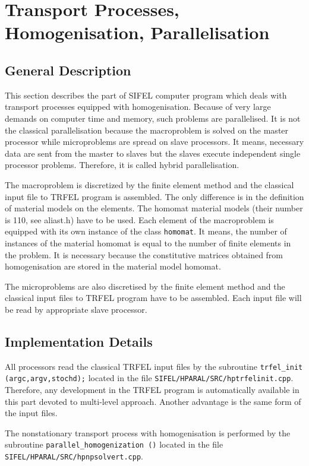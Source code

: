 \section{Transport Processes, Homogenisation, Parallelisation}

\subsection{General Description}

This section describes the part of SIFEL computer program
which deals with transport processes equipped with homogenisation.
Because of very large demands on computer time and memory,
such problems are parallelised. It is not the classical
parallelisation because the macroproblem is solved on the
master processor while microproblems are spread on slave processors.
It means, necessary data are sent from the master to slaves
but the slaves execute independent single processor problems.
Therefore, it is called hybrid parallelisation.

The macroproblem is discretized by the finite element method
and the classical input file to TRFEL program is assembled.
The only difference is in the definition of material models
on the elements. The homomat material models (their number is
110, see aliast.h) have to be used. Each element of the
macroproblem is equipped with its own instance of the class
{\tt homomat}. It means, the number of instances of the
material homomat is equal to the number of finite elements
in the problem. It is necessary because the constitutive matrices
obtained from homogenisation are stored in the material
model homomat.


The microproblems are also discretised by the finite element
method and the classical input files to TRFEL program
have to be assembled. Each input file will be read by
appropriate slave processor.

\subsection{Implementation Details}

All processors read the classical TRFEL input files by the
subroutine {\tt trfel\_init (argc,argv,stochd);} located
in the file {\tt SIFEL/HPARAL/SRC/hptrfelinit.cpp}.
Therefore, any development in the TRFEL program is automatically
available in this part devoted to multi-level approach.
Another advantage is the same form of the input files.

The nonstationary transport process with homogenisation is performed
by the subroutine {\tt parallel\_homogenization ()} located
in the file {\tt SIFEL/HPARAL/SRC/hpnpsolvert.cpp}.

